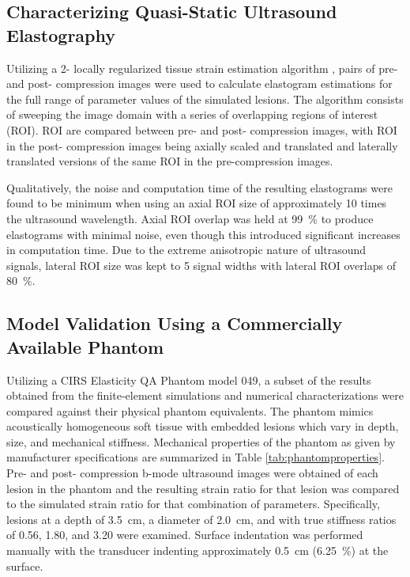 		\subsection{Characterizing Quasi-Static Ultrasound Elastography}
			\label{sec:elastography_algorithm}
			Utilizing a 2- locally regularized tissue strain estimation algorithm \cite{brusseau08}, pairs of pre- and post- compression images were used to calculate elastogram estimations for the full range of parameter values of the simulated lesions. The algorithm consists of sweeping the image domain with a series of overlapping regions of interest (ROI). ROI are compared between pre- and post- compression images, with ROI in the post- compression images being axially scaled and translated and laterally translated versions of the same ROI in the pre-compression images.

			Qualitatively, the noise and computation time of the resulting elastograms were found to be minimum when using an axial ROI size of approximately 10 times the ultrasound wavelength. Axial ROI overlap was held at \SI{99}{\percent} to produce elastograms with minimal noise, even though this introduced significant increases in computation time. Due to the extreme anisotropic nature of ultrasound signals, lateral ROI size was kept to 5 signal widths with lateral ROI overlaps of \SI{80}{\percent}.

		\subsection{Model Validation Using a Commercially Available Phantom}
			Utilizing a CIRS Elasticity QA Phantom model 049, a subset of the results obtained from the finite-element simulations and numerical characterizations were compared against their physical phantom equivalents. The phantom mimics acoustically homogeneous soft tissue with embedded lesions which vary in depth, size, and mechanical stiffness. Mechanical properties of the phantom as given by manufacturer specifications are summarized in Table \ref{tab:phantomproperties}. Pre- and post- compression b-mode ultrasound images were obtained of each lesion in the phantom and the resulting strain ratio for that lesion was compared to the simulated strain ratio for that combination of parameters. Specifically, lesions at a depth of \SI{3.5}{cm}, a diameter of \SI{2.0}{cm}, and with true stiffness ratios of 0.56, 1.80, and 3.20 were examined. Surface indentation was performed manually with the transducer indenting approximately \SI{0.5}{cm} (\SI{6.25}{\percent}) at the surface. 

